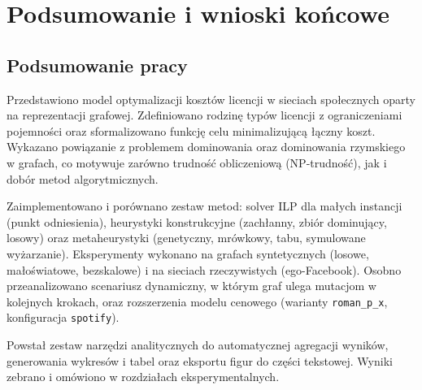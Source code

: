 \chapter{Podsumowanie i wnioski końcowe}

\section{Podsumowanie pracy}
Przedstawiono model optymalizacji kosztów licencji w sieciach społecznych oparty na reprezentacji grafowej. Zdefiniowano rodzinę typów licencji z ograniczeniami pojemności oraz sformalizowano funkcję celu minimalizującą łączny koszt. Wykazano powiązanie z problemem dominowania oraz dominowania rzymskiego w grafach, co motywuje zarówno trudność obliczeniową (NP-trudność), jak i dobór metod algorytmicznych.

Zaimplementowano i porównano zestaw metod: solver ILP dla małych instancji (punkt odniesienia), heurystyki konstrukcyjne (zachłanny, zbiór dominujący, losowy) oraz metaheurystyki (genetyczny, mrówkowy, tabu, symulowane wyżarzanie). Eksperymenty wykonano na grafach syntetycznych (losowe, małoświatowe, bezskalowe) i na sieciach rzeczywistych (ego-Facebook). Osobno przeanalizowano scenariusz dynamiczny, w którym graf ulega mutacjom w kolejnych krokach, oraz rozszerzenia modelu cenowego (warianty \texttt{roman\_p\_x}, konfiguracja \texttt{spotify}).

Powstał zestaw narzędzi analitycznych do automatycznej agregacji wyników, generowania wykresów i tabel oraz eksportu figur do części tekstowej. Wyniki zebrano i omówiono w rozdziałach eksperymentalnych.

